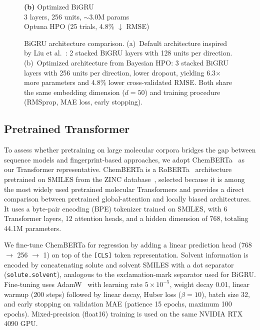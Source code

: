 \documentclass[journal=jcisd8,manuscript=article]{achemso}
\begin{document}
\begin{figure}[htbp]
\begin{minipage}[t]{0.45\textwidth}
\textbf{(b)} Optimized BiGRU\\[2pt]
{\small 3 layers, 256 units, $\sim$3.0M params\\Optuna HPO (25 trials, 4.8\% $\downarrow$ RMSE)}
\end{minipage}

\caption{BiGRU architecture comparison. (a)~Default architecture inspired by Liu et al.~\cite{liuPredictionMolecularToxicity2023}: 2 stacked BiGRU layers with 128 units per direction. (b)~Optimized architecture from Bayesian HPO: 3 stacked BiGRU layers with 256 units per direction, lower dropout, yielding 6.3$\times$ more parameters and 4.8\% lower cross-validated RMSE. Both share the same embedding dimension ($d=50$) and training procedure (RMSprop, MAE loss, early stopping).}
\label{fig:bigru_architectures}
\end{figure}


\FloatBarrier
\subsection{Pretrained Transformer}
\label{sec:chemberta}

To assess whether pretraining on large molecular corpora bridges the gap between sequence models and fingerprint-based approaches, we adopt ChemBERTa~\cite{chithrananda2020chemberta} as our Transformer representative.
ChemBERTa is a RoBERTa~\cite{liu2019roberta} architecture pretrained on SMILES from the ZINC database~\cite{irwin2005zinc}, selected because it is among the most widely used pretrained molecular Transformers and provides a direct comparison between pretrained global-attention and locally biased architectures.
It uses a byte-pair encoding (BPE) tokenizer trained on SMILES, with 6 Transformer layers, 12 attention heads, and a hidden dimension of 768, totaling 44.1M parameters.

We fine-tune ChemBERTa for regression by adding a linear prediction head (768 $\to$ 256 $\to$ 1) on top of the \texttt{[CLS]} token representation.
Solvent information is encoded by concatenating solute and solvent SMILES with a dot separator (\texttt{solute.solvent}), analogous to the exclamation-mark separator used for BiGRU.
Fine-tuning uses AdamW~\cite{loshchilov2019decoupled} with learning rate $5 \times 10^{-5}$, weight decay 0.01, linear warmup (200 steps) followed by linear decay, Huber loss ($\beta = 10$), batch size 32, and early stopping on validation MAE (patience 15 epochs, maximum 100 epochs).
Mixed-precision (float16) training is used on the same NVIDIA RTX 4090 GPU.
\end{document}
